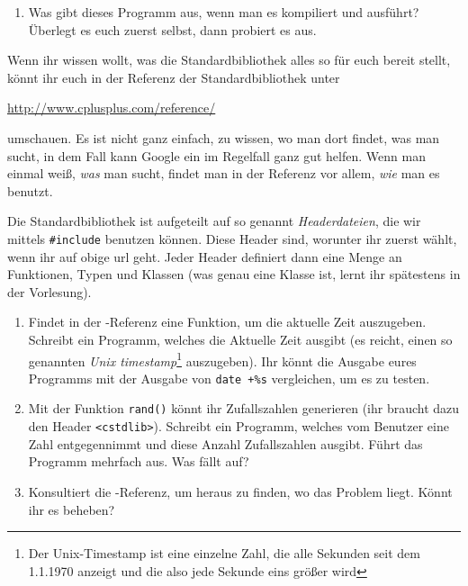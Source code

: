 \begin{praxis}
    \begin{enumerate}
        \item Was gibt dieses Programm aus, wenn man es kompiliert und ausführt?
              Überlegt es euch zuerst selbst, dann probiert es aus.
    \end{enumerate}

    Wenn ihr wissen wollt, was die Standardbibliothek alles so für euch bereit
    stellt, könnt ihr euch in der Referenz der Standardbibliothek unter

    \url{http://www.cplusplus.com/reference/}

    umschauen. Es ist nicht ganz einfach, zu wissen, wo man dort findet, was man
    sucht, in dem Fall kann Google ein im Regelfall ganz gut helfen. Wenn man
    einmal weiß, \emph{was} man sucht, findet man in der Referenz vor allem,
    \emph{wie} man es benutzt.

    Die Standardbibliothek ist aufgeteilt auf so genannt \emph{Headerdateien}, die
    wir mittels \texttt{\#include} benutzen können. Diese Header sind, worunter ihr
    zuerst wählt, wenn ihr auf obige url geht. Jeder Header definiert dann eine
    Menge an Funktionen, Typen und Klassen (was genau eine Klasse ist, lernt ihr
    spätestens in der Vorlesung).

    \begin{enumerate}[resume]
        \item Findet in der \Cpp-Referenz eine Funktion, um die aktuelle Zeit
              auszugeben. Schreibt ein Programm, welches die Aktuelle Zeit ausgibt
              (es reicht, einen so genannten \emph{Unix timestamp}\footnote{Der
                  Unix-Timestamp ist eine einzelne Zahl, die alle Sekunden seit dem
                  1.1.1970 anzeigt und die also jede Sekunde eins größer wird} auszugeben).
              Ihr könnt die Ausgabe eures Programms mit der Ausgabe von \texttt{date
                  +\%s} vergleichen, um es zu testen.
        \item Mit der Funktion \texttt{rand()} könnt ihr Zufallszahlen generieren
              (ihr braucht dazu den Header \texttt{<cstdlib>}). Schreibt ein
              Programm, welches vom Benutzer eine Zahl entgegennimmt und diese Anzahl
              Zufallszahlen ausgibt. Führt das Programm mehrfach aus. Was fällt auf?
        \item Konsultiert die \Cpp-Referenz, um heraus zu finden, wo das Problem
              liegt. Könnt ihr es beheben?
    \end{enumerate}
\end{praxis}
